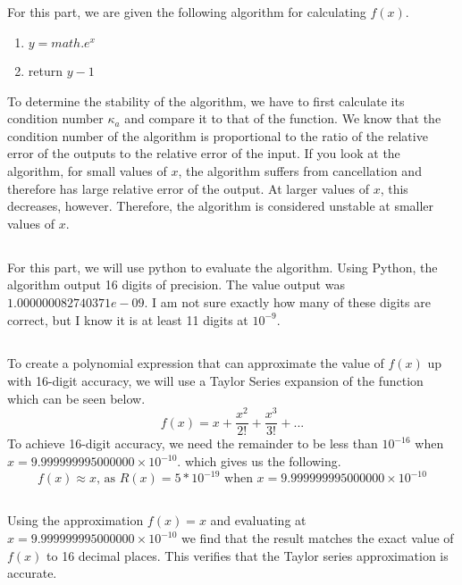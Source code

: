 \documentclass{article}
\begin{document}
\subsection{}
For this part, we are given the following algorithm for calculating \(f(x)\).
\begin{enumerate}
    \item \(y=math.e^x\)
    \item return \(y-1\)
\end{enumerate}
To determine the stability of the algorithm, we have to first calculate its condition number \(\kappa_a\) and compare it to that of the function. We know that the condition number of the algorithm is proportional to the ratio of the relative error of the outputs to the relative error of the input. If you look at the algorithm, for small values of \(x\), the algorithm suffers from cancellation and therefore has large relative error of the output. At larger values of \(x\), this decreases, however. Therefore, the algorithm is considered unstable at smaller values of \(x\).

\subsection{}
For this part, we will use python to evaluate the algorithm. Using Python, the algorithm output 16 digits of precision. The value output was \(1.000000082740371e-09\). I am not sure exactly how many of these digits are correct, but I know it is at least 11 digits at \(10^{-9}\).

\subsection{}
To create a polynomial expression that can approximate the value of \(f(x)\) up with 16-digit accuracy, we will use a Taylor Series expansion of the function which can be seen below.
\[
f(x) = x + \frac{x^2}{2!}+\frac{x^3}{3!}+...
\]
To achieve 16-digit accuracy, we need the remainder to be less than \(10^{-16}\) when \(x=9.999999995000000×10^{-10}\). which gives us the following.
\[
f(x) \approx x \mbox{, as } R(x) = 5*10^{-19} \mbox{ when } x = 9.999999995000000×10^{-10}
\]

\subsection{}
Using the approximation \(f(x)=x\) and evaluating at \(x=9.999999995000000×10^{-10}\) we find that the result matches the exact value of \(f(x)\) to 16 decimal places. This verifies that the Taylor series approximation is accurate.
\end{document}
